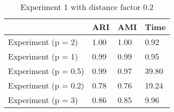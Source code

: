 \begin{table}
\centering
\caption{Experiment 1 with distance factor 0.2}
\begin{tabular}{llll}
\toprule
{} &   ARI &   AMI &   Time \\
\midrule
Experiment (p = 2)   &  1.00 &  1.00 &   0.92 \\
Experiment (p = 1)   &  0.99 &  0.99 &   0.95 \\
Experiment (p = 0.5) &  0.99 &  0.97 &  39.80 \\
Experiment (p = 0.2) &  0.78 &  0.76 &  19.24 \\
Experiment (p = 3)   &  0.86 &  0.85 &   9.96 \\
\bottomrule
\end{tabular}
\end{table}
